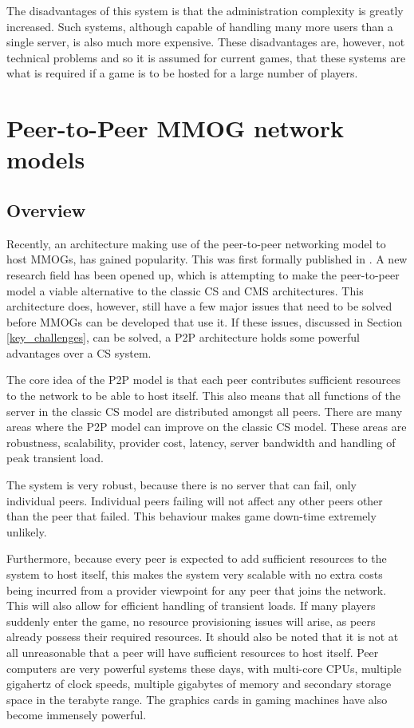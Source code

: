 \documentclass[journal,oneside,a4paper,onecolumn]{IEEEtran}
\begin{document}
The disadvantages of this system is that the administration complexity is greatly increased. Such systems, although capable of handling many more users than a single server, is also much more expensive. These disadvantages are, however, not technical problems and so it is assumed for current games, that these systems are what is required if a game is to be hosted for a large number of players.

\section{Peer-to-Peer MMOG network models}
\label{p2p_network_models}

\subsection{Overview}
\label{p2p_mmog_overview}

Recently, an architecture making use of the peer-to-peer networking model to host MMOGs, has gained popularity. This was first formally published in \cite{knutsson_p2p_first}. A new research field has been opened up, which is attempting to make the peer-to-peer model a viable alternative to the classic \ac{CS} and \ac{CMS} architectures. This architecture does, however, still have a few major issues that need to be solved before MMOGs can be developed that use it. If these issues, discussed in Section \ref{key_challenges}, can be solved, a \ac{P2P} architecture holds some powerful advantages over a \ac{CS} system.

The core idea of the \ac{P2P} model is that each peer contributes sufficient resources to the network to be able to host itself. This also means that all functions of the server in the classic \ac{CS} model are distributed amongst all peers. There are many areas where the \ac{P2P} model can improve on the classic \ac{CS} model. These areas are robustness, scalability, provider cost, latency, server bandwidth and handling of peak transient load.

The system is very robust, because there is no server that can fail, only individual peers. Individual peers failing will not affect any other peers other than the peer that failed. This behaviour makes game down-time extremely unlikely.

Furthermore, because every peer is expected to add sufficient resources to the system to host itself, this makes the system very scalable with no extra costs being incurred from a provider viewpoint for any peer that joins the network. This will also allow for efficient handling of transient loads. If many players suddenly enter the game, no resource provisioning issues will arise, as peers already possess their required resources. It should also be noted that it is not at all unreasonable that a peer will have sufficient resources to host itself. Peer computers are very powerful systems these days, with multi-core CPUs, multiple gigahertz of clock speeds, multiple gigabytes of memory and secondary storage space in the terabyte range. The graphics cards in gaming machines have also become immensely powerful.
\end{document}
